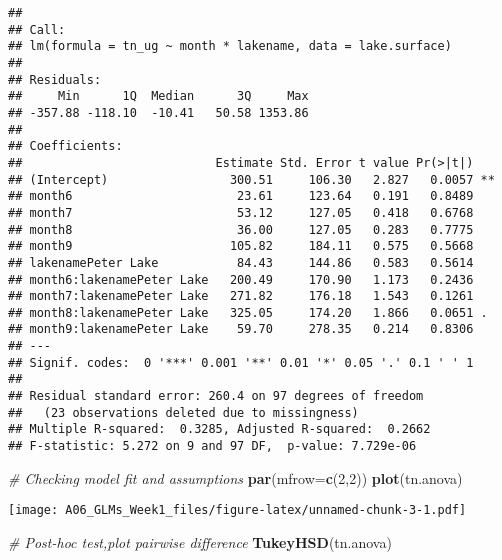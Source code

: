 \documentclass[]{article}
\newenvironment{Shaded}{\begin{snugshade}}{\end{snugshade}}
\newcommand{\CommentTok}[1]{\textcolor[rgb]{0.56,0.35,0.01}{\textit{#1}}}
\newcommand{\DataTypeTok}[1]{\textcolor[rgb]{0.13,0.29,0.53}{#1}}
\newcommand{\DecValTok}[1]{\textcolor[rgb]{0.00,0.00,0.81}{#1}}
\newcommand{\KeywordTok}[1]{\textcolor[rgb]{0.13,0.29,0.53}{\textbf{#1}}}
\newcommand{\NormalTok}[1]{#1}
\begin{document}
\begin{verbatim}
## 
## Call:
## lm(formula = tn_ug ~ month * lakename, data = lake.surface)
## 
## Residuals:
##     Min      1Q  Median      3Q     Max 
## -357.88 -118.10  -10.41   50.58 1353.86 
## 
## Coefficients:
##                           Estimate Std. Error t value Pr(>|t|)   
## (Intercept)                 300.51     106.30   2.827   0.0057 **
## month6                       23.61     123.64   0.191   0.8489   
## month7                       53.12     127.05   0.418   0.6768   
## month8                       36.00     127.05   0.283   0.7775   
## month9                      105.82     184.11   0.575   0.5668   
## lakenamePeter Lake           84.43     144.86   0.583   0.5614   
## month6:lakenamePeter Lake   200.49     170.90   1.173   0.2436   
## month7:lakenamePeter Lake   271.82     176.18   1.543   0.1261   
## month8:lakenamePeter Lake   325.05     174.20   1.866   0.0651 . 
## month9:lakenamePeter Lake    59.70     278.35   0.214   0.8306   
## ---
## Signif. codes:  0 '***' 0.001 '**' 0.01 '*' 0.05 '.' 0.1 ' ' 1
## 
## Residual standard error: 260.4 on 97 degrees of freedom
##   (23 observations deleted due to missingness)
## Multiple R-squared:  0.3285, Adjusted R-squared:  0.2662 
## F-statistic: 5.272 on 9 and 97 DF,  p-value: 7.729e-06
\end{verbatim}

\begin{Shaded}
\begin{Highlighting}[]
\CommentTok{# Checking model fit and assumptions}
\KeywordTok{par}\NormalTok{(}\DataTypeTok{mfrow=}\KeywordTok{c}\NormalTok{(}\DecValTok{2}\NormalTok{,}\DecValTok{2}\NormalTok{))}
\KeywordTok{plot}\NormalTok{(tn.anova)}
\end{Highlighting}
\end{Shaded}

\texttt{[image: A06\_GLMs\_Week1\_files/figure-latex/unnamed-chunk-3-1.pdf]}

\begin{Shaded}
\begin{Highlighting}[]
\CommentTok{# Post-hoc test,plot pairwise difference}
\KeywordTok{TukeyHSD}\NormalTok{(tn.anova)}
\end{Highlighting}
\end{Shaded}
\end{document}

